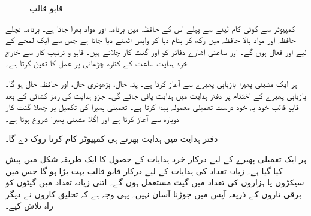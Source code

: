 \begin{figure}
\caption{قابو قالب}
\label{شکل_کمپیوٹر_قابو_دور}
\end{figure}

کمپیوٹر سے کوئی کام لینے سے پہلے اس کے حافظہ میں  برنامہ  اور مواد بھرا جاتا ہے۔ برنامہ نچلے حافظہ اور مواد بالا حافظہ میں رکھ کر   بتام  دبا کر واپس  اٹھنے دیا جاتا ہے جس سے ایک لمحے کے لیے   اور  فعال ہوں گے۔  اور  ساعتی اشارے دفاتر کو  اور گنت کار چلاتے ہیں۔ قابو و ترتیب کار سے خارج  خرد ہدایت  ساعت کے کنارہ چڑھائی پر   عمل کا تعین کرتا ہے۔

ہر ایک  مشینی  پھیرا  بازیابی پھیرے سے آغاز کرتا ہے۔  پتہ حال،  بڑھوتری حال، اور  حافظہ حال ہو گا۔ بازیابی پھیرے کے اختتام پر  دفتر ہدایت میں ہدایت پائی جائے گی۔  جزو ہدایت   کی رمز کشائی کے بعد  قابو قالب خود بہ خود   درست تعمیلی معمولہ پیدا کرتا ہے۔ تعمیلی پھیرا  کی تکمیل   پر چھلا گنت کار دوبارہ  سے آغاز کرتا ہے اور اگلا مشینی پھیرا شروع ہوتا ہے۔

دفتر ہدایت میں   ہدایت    بھرتے ہی  کمپیوٹر کام    کرنا  روک دے گا۔

ہر ایک تعمیلی پھیرے کے لیے درکار خرد ہدایات  کے حصول کا ایک طریقہ شکل  میں پیش کیا گیا ہے۔ زیادہ تعداد کی  ہدایات  کے لیے درکار قابو قالب بہت بڑا ہو گا جس میں سیکڑوں یا ہزاروں کی تعداد میں گیٹ مستعمل ہوں گے۔ اتنی زیادہ تعداد میں گیٹوں کو برقی تاروں کے ذریعہ آپس میں جوڑنا آسان نہیں۔ یہی وجہ ہے کہ تخلیق کاروں نے دیگر راہ تلاش کیے۔

